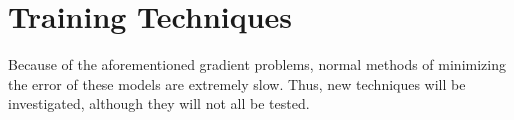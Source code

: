 \documentclass[12pt, titlepage]{article}
\begin{document}






\section{Training Techniques}
Because of the aforementioned gradient problems, normal methods of minimizing
the error of these models are extremely slow. Thus, new techniques will be
investigated, although they will not all be tested.
\end{document}
